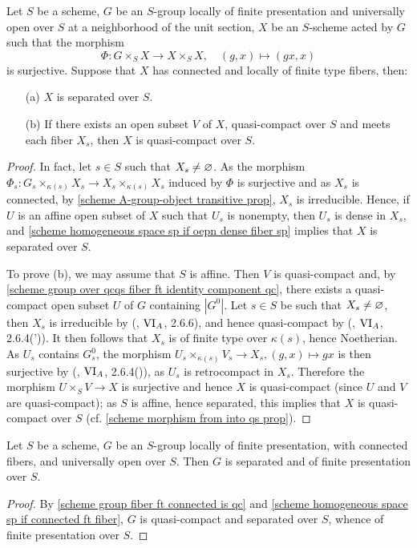 \begin{corollary}\label{scheme homogeneous space sp if connected ft fiber}
Let $S$ be a scheme, $G$ be an $S$-group locally of finite presentation and universally open over $S$ at a neighborhood of the unit section, $X$ be an $S$-scheme acted by $G$ such that the morphism
\[\Phi:G\times_SX\to X\times_SX,\quad (g,x)\mapsto (gx,x)\]
is surjective. Suppose that $X$ has connected and locally of finite type fibers, then:
\begin{enumerate}
    \item[(a)] $X$ is separated over $S$.
    \item[(b)] If there exists an open subset $V$ of $X$, quasi-compact over $S$ and meets each fiber $X_s$, then $X$ is quasi-compact over $S$. 
\end{enumerate}
\end{corollary}
\begin{proof}
In fact, let $s\in S$ such that $X_s\neq\varnothing$. As the morphism $\Phi_s:G_s\times_{\kappa(s)}X_s\to X_s\times_{\kappa(s)}X_s$ induced by $\Phi$ is surjective and as $X_s$ is connected, by \cref{scheme A-group-object transitive prop}, $X_s$ is irreducible. Hence, if $U$ is an affine open subset of $X$ such that $U_s$ is nonempty, then $U_s$ is dense in $X_s$, and \cref{scheme homogeneous space sp if oepn dense fiber sp} implies that $X$ is separated over $S$.\par
To prove (b), we may assume that $S$ is affine. Then $V$ is quasi-compact and, by \cref{scheme group over qcqs fiber ft identity component qc}, there exists a quasi-compact open subset $U$ of $G$ containing $|G^0|$. Let $s\in S$ be such that $X_s\neq\varnothing$, then $X_s$ is irreducible by (\cite{SGA3-1}, $\Rmnum{6}_A$, 2.6.6), and hence quasi-compact by (\cite{SGA3-1}, $\Rmnum{6}_A$, 2.6.4(')). It then follows that $X_s$ is of finite type over $\kappa(s)$, hence Noetherian. As $U_s$ contains $G_s^0$, the morphism $U_s\times_{\kappa(s)}V_s\to X_s,(g,x)\mapsto gx$ is then surjective by (\cite{SGA3-1}, $\Rmnum{6}_A$, 2.6.4()), as $U_s$ is retrocompact in $X_s$. Therefore the morphism $U\times_SV\to X$ is surjective and hence $X$ is quasi-compact (since $U$ and $V$ are quasi-compact); as $S$ is affine, hence separated, this implies that $X$ is quasi-compact over $S$ (cf. \cref{scheme morphism from into qs prop}).
\end{proof}

\begin{corollary}\label{scheme group local fp connected fiber uo is separated and qc}
Let $S$ be a scheme, $G$ be an $S$-group locally of finite presentation, with connected fibers, and universally open over $S$. Then $G$ is separated and of finite presentation over $S$.
\end{corollary}
\begin{proof}
By \cref{scheme group fiber ft connected is qc} and \cref{scheme homogeneous space sp if connected ft fiber}, $G$ is quasi-compact and separated over $S$, whence of finite presentation over $S$.
\end{proof}

